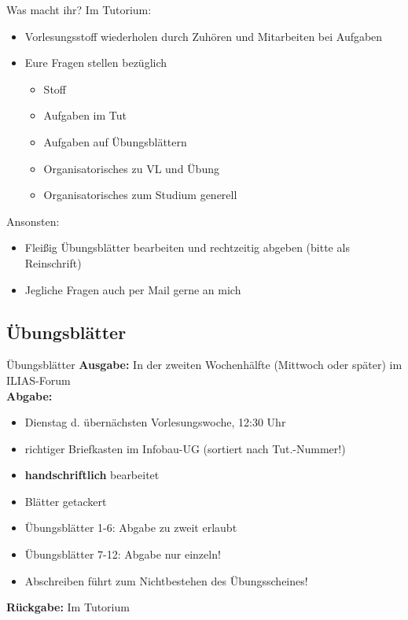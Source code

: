 {		\begin{frame}{Was macht ihr?}
			Im Tutorium:
			\begin{itemize}
				\item Vorlesungsstoff wiederholen durch Zuhören und Mitarbeiten bei Aufgaben
				\item Eure Fragen stellen bezüglich \begin{itemize}
					\item Stoff
					\item Aufgaben im Tut
					\item Aufgaben auf Übungsblättern
					\item Organisatorisches zu VL und Übung
					\item Organisatorisches zum Studium generell
				\end{itemize}
			\end{itemize}
			\pause
			\medskip
			Ansonsten:
			\begin{itemize}
				\item Fleißig Übungsblätter bearbeiten und rechtzeitig abgeben (bitte als Reinschrift)
				\item Jegliche Fragen auch per Mail gerne an mich
			\end{itemize}

		\end{frame}
	}
	
\subsection{Übungsblätter}
	\begin{frame}{Übungsblätter}
		\textbf{Ausgabe:} In der zweiten Wochenhälfte (Mittwoch oder später) im ILIAS-Forum \\
		\pause
		\textbf{Abgabe:}
			\begin{itemize}
				\item Dienstag d. übernächsten Vorlesungswoche, 12:30 Uhr
				\item richtiger Briefkasten im Infobau-UG (sortiert nach Tut.-Nummer!)
				\pause
				\item \textbf{handschriftlich} bearbeitet
				\item Blätter getackert
				\item Übungsblätter 1-6: Abgabe zu zweit erlaubt
				\item Übungsblätter 7-12: Abgabe nur einzeln!
				\item Abschreiben führt zum Nichtbestehen des Übungsscheines!
			\end{itemize}
		\pause	
		\textbf{Rückgabe:} Im Tutorium
	\end{frame}
